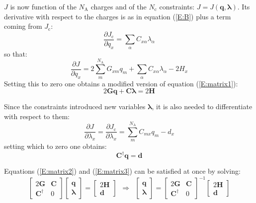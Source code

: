 \documentclass[a4paper]{report}
\newcommand{\bs}{\boldsymbol}
\newcommand{\NAA}[0]{{N_\mathrm{A}}}
\newcommand{\NCC}[0]{{N_\mathrm{c}}}
\begin{document}
$J$ is now function of the $\NAA$ charges and of the $\NCC$ constraints: $J = J(\bs{q},\bs{\lambda})$. Its derivative with respect to the charges is as in equation (\ref{E:B}) plus a term coming from $J_\mathrm{c}$:
\begin{equation}
\frac{\partial J_\mathrm{c}}{\partial q_x} = \sum_\alpha C_{x\alpha} \lambda_\alpha
\end{equation}
so that:
\begin{equation}
\frac{\partial J}{\partial q_x} = 2 \sum_m^\NAA G_{xm} q_m + \sum_\alpha C_{x\alpha} \lambda_\alpha - 2 H_x
\end{equation}
Setting this to zero one obtains a modified version of equation (\ref{E:matrix1}):
\begin{equation}
2\bs{G} \bs{q} + \bs{C}\bs{\lambda} = 2\bs{H}
\end{equation}

Since the constraints introduced new variables $\bs{\lambda}$, it is also needed to differentiate with respect to them:
\begin{equation}
\label{E:matrix2}
\frac{\partial J}{\partial \lambda_x} = \frac{\partial J_\mathrm{c}}{\partial \lambda_x} = \sum_m^\NAA C_{mx} q_m - d_x
\end{equation}
setting which to zero one obtains:
\begin{equation}
\label{E:matrix3}
\bs{C}^\dag\bs{q} = \bs{d}
\end{equation}

Equations (\ref{E:matrix2}) and (\ref{E:matrix3}) can be satisfied at once by solving:
\begin{equation}
\left[ \begin{array}{cc}
2\bs{G} & \bs{C} \\
\bs{C}^\dag & 0
\end{array}\right] 
\left[\begin{array}{c}
\bs{q} \\ \bs{\lambda}
\end{array}\right] = 
\left[\begin{array}{c}
2\bs{H} \\ \bs{d}
\end{array}\right] 
\,\,\,\Rightarrow \,\,\,
\left[\begin{array}{c}
\bs{q} \\ \bs{\lambda}
\end{array}\right] =
\left[ \begin{array}{cc}
2\bs{G} & \bs{C} \\
\bs{C}^\dag & 0
\end{array}\right]^{-1}
\left[\begin{array}{c}
2\bs{H} \\ \bs{d}
\end{array}\right]
\end{equation}
\end{document}
